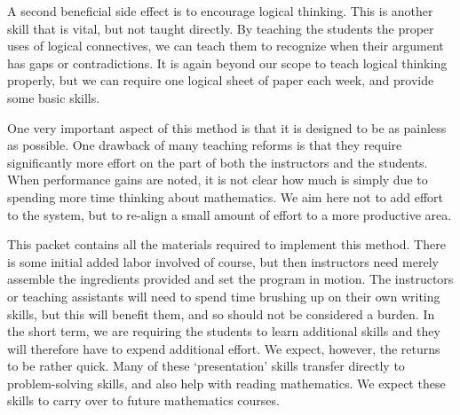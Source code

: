 A second beneficial side effect is to encourage logical thinking. This is
another skill that is vital, but not taught directly. By teaching the
students the proper uses of logical connectives, we can teach them to
recognize when their argument has gaps or contradictions. It is again
beyond our scope to teach logical thinking properly, but we can require one
logical sheet of paper each week, and provide some basic skills.

One very important aspect of this method is that it is designed to be as
painless as possible. One drawback of many teaching reforms is that they
require significantly more effort on the part of both the instructors and
the students. When performance gains are noted, it is not clear how much is
simply due to spending more time thinking about mathematics. We aim here
not to add effort to the system, but to re-align a small amount of effort
to a more productive area.

This packet contains all the materials required to implement this
method.  There is some initial added labor involved of course, but
then instructors need merely assemble the ingredients provided and set
the program in motion.  The instructors or teaching assistants will
need to spend time brushing up on their own writing skills, but this
will benefit them, and so should not be considered a burden.  In the
short term, we are requiring the students to learn additional skills
and they will therefore have to expend additional effort. We expect,
however, the returns to be rather quick. Many of these `presentation'
skills transfer directly to problem-solving skills, and also help with
reading mathematics. We expect these skills to carry over to future
mathematics courses.
